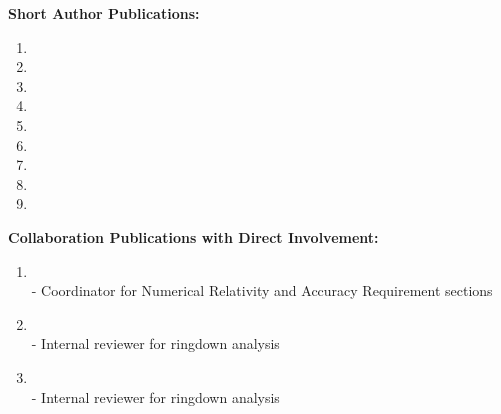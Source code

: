 \documentclass[11pt]{article}
\newcounter{papers}
\begin{document}
\begin{flushleft}
  \vspace{8px}

  \textbf{Short Author Publications:}
  \begin{enumerate}      
    \item {}
    \item {}
    \item {}
    \item {}
	\item {}
    \item {}
    \item {}
    \item {}
    \item {}
    \setcounter{papers}{\value{enumi}}
  \end{enumerate}
  
  \textbf{Collaboration Publications with Direct Involvement:}  
  \begin{enumerate}
  \setcounter{enumi}{\value{papers}}
  \item {}\\
  - Coordinator for Numerical Relativity and Accuracy Requirement sections
  \item {}\\
  - Internal reviewer for ringdown analysis
  \item {}\\
  - Internal reviewer for ringdown analysis
  \setcounter{papers}{\value{enumi}}
  \end{enumerate}
  

\end{flushleft}
\end{document}
